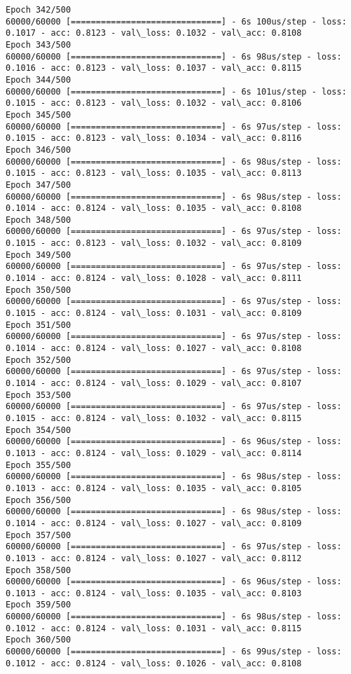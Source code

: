 \documentclass[11pt]{article}
\begin{document}
\begin{Verbatim}[commandchars=\\\{\}]
Epoch 342/500
60000/60000 [==============================] - 6s 100us/step - loss: 0.1017 - acc: 0.8123 - val\_loss: 0.1032 - val\_acc: 0.8108
Epoch 343/500
60000/60000 [==============================] - 6s 98us/step - loss: 0.1016 - acc: 0.8123 - val\_loss: 0.1037 - val\_acc: 0.8115
Epoch 344/500
60000/60000 [==============================] - 6s 101us/step - loss: 0.1015 - acc: 0.8123 - val\_loss: 0.1032 - val\_acc: 0.8106
Epoch 345/500
60000/60000 [==============================] - 6s 97us/step - loss: 0.1015 - acc: 0.8123 - val\_loss: 0.1034 - val\_acc: 0.8116
Epoch 346/500
60000/60000 [==============================] - 6s 98us/step - loss: 0.1015 - acc: 0.8123 - val\_loss: 0.1035 - val\_acc: 0.8113
Epoch 347/500
60000/60000 [==============================] - 6s 98us/step - loss: 0.1014 - acc: 0.8124 - val\_loss: 0.1035 - val\_acc: 0.8108
Epoch 348/500
60000/60000 [==============================] - 6s 97us/step - loss: 0.1015 - acc: 0.8123 - val\_loss: 0.1032 - val\_acc: 0.8109
Epoch 349/500
60000/60000 [==============================] - 6s 97us/step - loss: 0.1014 - acc: 0.8124 - val\_loss: 0.1028 - val\_acc: 0.8111
Epoch 350/500
60000/60000 [==============================] - 6s 97us/step - loss: 0.1015 - acc: 0.8124 - val\_loss: 0.1031 - val\_acc: 0.8109
Epoch 351/500
60000/60000 [==============================] - 6s 97us/step - loss: 0.1014 - acc: 0.8124 - val\_loss: 0.1027 - val\_acc: 0.8108
Epoch 352/500
60000/60000 [==============================] - 6s 97us/step - loss: 0.1014 - acc: 0.8124 - val\_loss: 0.1029 - val\_acc: 0.8107
Epoch 353/500
60000/60000 [==============================] - 6s 97us/step - loss: 0.1015 - acc: 0.8124 - val\_loss: 0.1032 - val\_acc: 0.8115
Epoch 354/500
60000/60000 [==============================] - 6s 96us/step - loss: 0.1013 - acc: 0.8124 - val\_loss: 0.1029 - val\_acc: 0.8114
Epoch 355/500
60000/60000 [==============================] - 6s 98us/step - loss: 0.1013 - acc: 0.8124 - val\_loss: 0.1035 - val\_acc: 0.8105
Epoch 356/500
60000/60000 [==============================] - 6s 98us/step - loss: 0.1014 - acc: 0.8124 - val\_loss: 0.1027 - val\_acc: 0.8109
Epoch 357/500
60000/60000 [==============================] - 6s 97us/step - loss: 0.1013 - acc: 0.8124 - val\_loss: 0.1027 - val\_acc: 0.8112
Epoch 358/500
60000/60000 [==============================] - 6s 96us/step - loss: 0.1013 - acc: 0.8124 - val\_loss: 0.1035 - val\_acc: 0.8103
Epoch 359/500
60000/60000 [==============================] - 6s 98us/step - loss: 0.1012 - acc: 0.8124 - val\_loss: 0.1031 - val\_acc: 0.8115
Epoch 360/500
60000/60000 [==============================] - 6s 99us/step - loss: 0.1012 - acc: 0.8124 - val\_loss: 0.1026 - val\_acc: 0.8108

\end{Verbatim}
\end{document}
